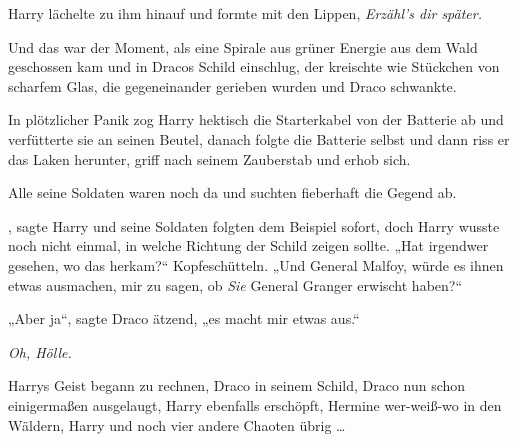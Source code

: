 Harry lächelte zu ihm hinauf und formte mit den Lippen, \emph{Erzähl’s dir später.}

Und das war der Moment, als eine Spirale aus grüner Energie aus dem Wald geschossen kam und in Dracos Schild einschlug, der kreischte wie Stückchen von scharfem Glas, die gegeneinander gerieben wurden und Draco schwankte.

In plötzlicher Panik zog Harry hektisch die Starterkabel von der Batterie ab und verfütterte sie an seinen Beutel, danach folgte die Batterie selbst und dann riss er das Laken herunter, griff nach seinem Zauberstab und erhob sich.

Alle seine Soldaten waren noch da und suchten fieberhaft die Gegend ab.

, sagte Harry und seine Soldaten folgten dem Beispiel sofort, doch Harry wusste noch nicht einmal, in welche Richtung der Schild zeigen sollte.
„Hat irgendwer gesehen, wo das herkam?“ Kopfeschütteln.
„Und General Malfoy, würde es ihnen etwas ausmachen, mir zu sagen, ob \emph{Sie} General Granger erwischt haben?“

„Aber ja“, sagte Draco ätzend, „es macht mir etwas aus.“

\emph{Oh, Hölle.}

Harrys Geist begann zu rechnen, Draco in seinem Schild, Draco nun schon einigermaßen ausgelaugt, Harry ebenfalls erschöpft, Hermine wer-weiß-wo in den Wäldern, Harry und noch vier andere Chaoten übrig …

